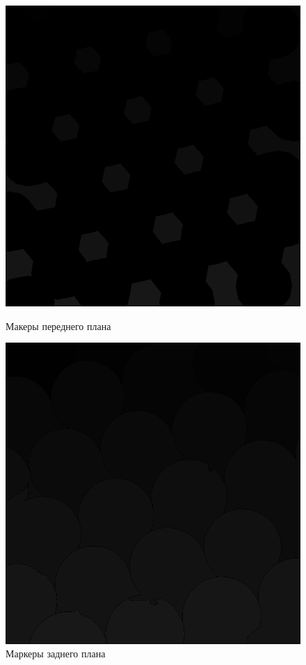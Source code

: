 \begin{figure}[!htb]
    \includegraphics[width=\linewidth]{../img/outputs/segmentation_watershed/balls_front_markers.png}
    \caption{Макеры переднего плана}
    \endminipage\hfill
    \includegraphics[width=\linewidth]{../img/outputs/segmentation_watershed/balls_back_markers.png}
    \caption{Маркеры заднего плана}
    \endminipage\hfill
\end{figure}
